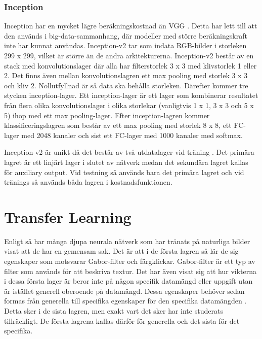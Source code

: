 \documentclass[]{kththesis}
\begin{document}
\subsubsection{Inception}
Inception har en mycket lägre beräkningskostnad än VGG \parencite{szegedy2016rethinking}. Detta har lett till att den används i big-data-sammanhang, där modeller med större beräkningskraft inte har kunnat användas. Inception-v2 tar som indata RGB-bilder i storleken 299 x 299, vilket är större än de andra arkitekturerna. Inception-v2 består av en stack med konvolutionslager där alla har filterstorlek 3 x 3 med klivstorlek 1 eller 2. Det finns även mellan konvolutionslagren ett max pooling med storlek 3 x 3 och kliv 2. Nollutfyllnad är så data ska behålla storleken. Därefter kommer tre stycken inception-lager. Ett inception-lager är ett lager som kombinerar resultatet från flera olika konvolutionslager i olika storlekar (vanligtvis 1 x 1, 3 x 3 och 5 x 5) ihop med ett max pooling-lager. Efter inception-lagren kommer klassificeringslagren som består av ett max pooling med storlek 8 x 8, ett FC-lager med 2048 kanaler och sist ett FC-lager med 1000 kanaler med softmax.

Inception-v2 är unikt då det består av två utdatalager vid träning \parencite{szegedy2016rethinking}. Det primära lagret är ett linjärt lager i slutet av nätverk medan det sekundära lagret kallas för auxiliary output. Vid testning så används bara det primära lagret och vid tränings så används båda lagren i kostnadsfunktionen.

\section{Transfer Learning}
Enligt \cite{yosinski2014transferable} så har många djupa neurala nätverk som har tränats på naturliga bilder visat att de har en gemensam sak. Det är att i de första lagren så lär de sig egenskaper som motsvarar Gabor-filter och färgklickar. Gabor-filter är ett typ av filter som används för att beskriva textur. Det har även visat sig att hur vikterna i dessa första lager är beror inte på någon specifik datamängd eller uppgift utan är istället generell oberoende på datamängd. Dessa egenskaper behöver sedan formas från generella till specifika egenskaper för den specifika datamängden \parencite{yosinski2014transferable}. Detta sker i de sista lagren, men exakt vart det sker har inte studerats tillräckligt. De första lagrena kallas därför för generella och det sista för det specifika.
\end{document}
